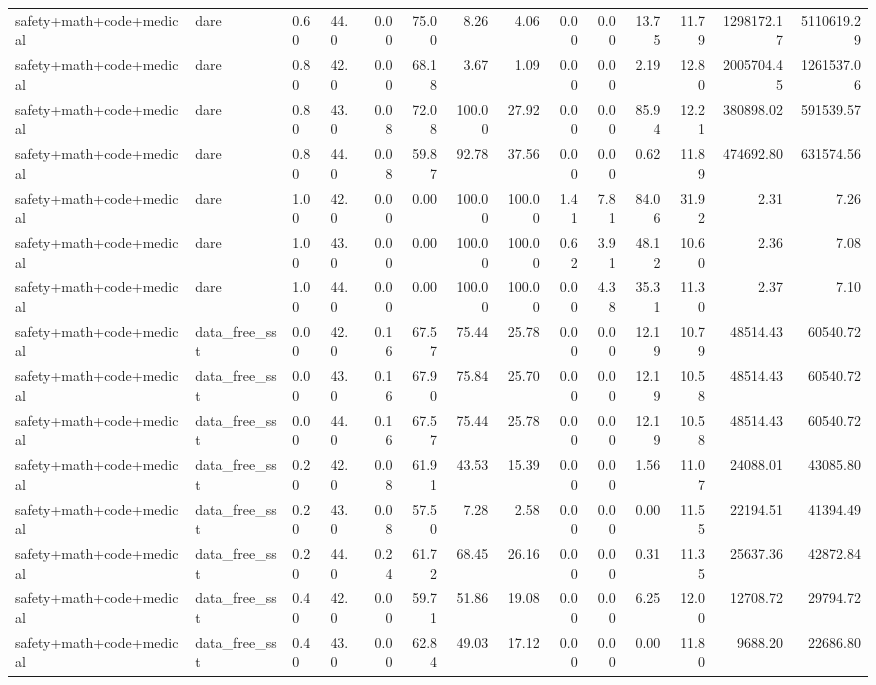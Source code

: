 \documentclass{article}
\begin{document}
\begin{table}[H]
{\begin{tabular}{llllrrrrrrrrrr}
safety+math+code+medical & dare & 0.60 & 44.0 & 0.00 & 75.00 & 8.26 & 4.06 & 0.00 & 0.00 & 13.75 & 11.79 & 1298172.17 & 5110619.29 \\
safety+math+code+medical & dare & 0.80 & 42.0 & 0.00 & 68.18 & 3.67 & 1.09 & 0.00 & 0.00 & 2.19 & 12.80 & 2005704.45 & 1261537.06 \\
safety+math+code+medical & dare & 0.80 & 43.0 & 0.08 & 72.08 & 100.00 & 27.92 & 0.00 & 0.00 & 85.94 & 12.21 & 380898.02 & 591539.57 \\
safety+math+code+medical & dare & 0.80 & 44.0 & 0.08 & 59.87 & 92.78 & 37.56 & 0.00 & 0.00 & 0.62 & 11.89 & 474692.80 & 631574.56 \\
safety+math+code+medical & dare & 1.00 & 42.0 & 0.00 & 0.00 & 100.00 & 100.00 & 1.41 & 7.81 & 84.06 & 31.92 & 2.31 & 7.26 \\
safety+math+code+medical & dare & 1.00 & 43.0 & 0.00 & 0.00 & 100.00 & 100.00 & 0.62 & 3.91 & 48.12 & 10.60 & 2.36 & 7.08 \\
safety+math+code+medical & dare & 1.00 & 44.0 & 0.00 & 0.00 & 100.00 & 100.00 & 0.00 & 4.38 & 35.31 & 11.30 & 2.37 & 7.10 \\
safety+math+code+medical & data\_free\_sst & 0.00 & 42.0 & 0.16 & 67.57 & 75.44 & 25.78 & 0.00 & 0.00 & 12.19 & 10.79 & 48514.43 & 60540.72 \\
safety+math+code+medical & data\_free\_sst & 0.00 & 43.0 & 0.16 & 67.90 & 75.84 & 25.70 & 0.00 & 0.00 & 12.19 & 10.58 & 48514.43 & 60540.72 \\
safety+math+code+medical & data\_free\_sst & 0.00 & 44.0 & 0.16 & 67.57 & 75.44 & 25.78 & 0.00 & 0.00 & 12.19 & 10.58 & 48514.43 & 60540.72 \\
safety+math+code+medical & data\_free\_sst & 0.20 & 42.0 & 0.08 & 61.91 & 43.53 & 15.39 & 0.00 & 0.00 & 1.56 & 11.07 & 24088.01 & 43085.80 \\
safety+math+code+medical & data\_free\_sst & 0.20 & 43.0 & 0.08 & 57.50 & 7.28 & 2.58 & 0.00 & 0.00 & 0.00 & 11.55 & 22194.51 & 41394.49 \\
safety+math+code+medical & data\_free\_sst & 0.20 & 44.0 & 0.24 & 61.72 & 68.45 & 26.16 & 0.00 & 0.00 & 0.31 & 11.35 & 25637.36 & 42872.84 \\
safety+math+code+medical & data\_free\_sst & 0.40 & 42.0 & 0.00 & 59.71 & 51.86 & 19.08 & 0.00 & 0.00 & 6.25 & 12.00 & 12708.72 & 29794.72 \\
safety+math+code+medical & data\_free\_sst & 0.40 & 43.0 & 0.00 & 62.84 & 49.03 & 17.12 & 0.00 & 0.00 & 0.00 & 11.80 & 9688.20 & 22686.80 \\

\end{tabular}}
\end{table}
\end{document}

